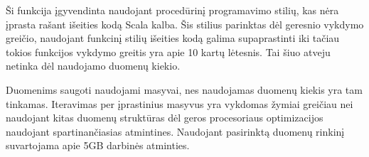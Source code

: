 Ši funkcija įgyvendinta naudojant procedūrinį programavimo stilių, kas nėra įprasta rašant išeities kodą Scala kalba. Šis stilius parinktas dėl geresnio vykdymo greičio, naudojant funkcinį stilių išeities kodą galima supaprastinti iki
tačiau tokios funkcijos vykdymo greitis yra apie 10 kartų lėtesnis. Tai šiuo atveju netinka dėl naudojamo duomenų kiekio.

 Duomenims saugoti naudojami masyvai, nes naudojamas duomenų kiekis yra tam tinkamas. Iteravimas per įprastinius masyvus yra vykdomas žymiai greičiau nei naudojant kitas duomenų struktūras dėl geros procesoriaus optimizacijos naudojant spartinančiasias atmintines. Naudojant pasirinktą duomenų rinkinį suvartojama apie 5GB darbinės atminties.